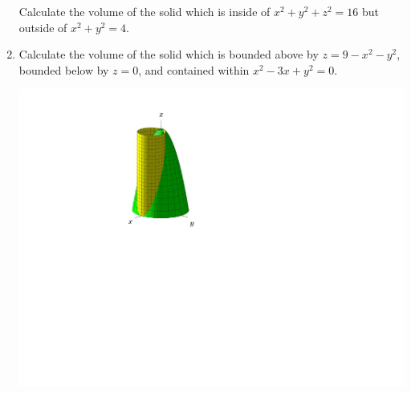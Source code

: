 \documentclass[12pt]{article}
\newif\ifans
\begin{document}
\begin{enumerate}
Calculate the volume of the solid which is inside of $x^2+y^2+z^2=16$ but outside of $x^2+y^2=4$.

\ifans{\fbox{$32\pi\sqrt{3}$}} \fi

\item Calculate the volume of the solid which is bounded above by $z=9-x^2-y^2$, bounded below by $z=0$, and contained within $x^2-3x+y^2=0$.

\begin{center}
\includegraphics[scale=0.7]{region2.pdf}
\end{center}

\ifans{\fbox{$\frac{405\pi}{32}$}} \fi

\end{enumerate}
\end{document}
